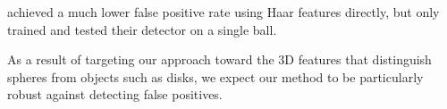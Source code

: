 \documentclass[11pt]{scrartcl}
\begin{document}
{        \citet{Treptow2004filter} achieved a much lower false positive rate
        using Haar features directly, but only trained and tested their
        detector on a single ball.




        As a result of targeting our approach toward the 3D features that
        distinguish spheres from objects such as disks, we expect our method
        to be particularly robust against detecting false positives.
    }
\end{document}

